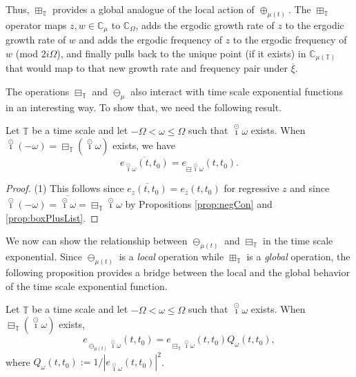 \documentclass[reqno]{amsart}
\begin{document}
Thus, $\boxplus_\mathbb{T}$ provides a global analogue of the local action of $\oplus_{\mu(t)}$.
The $\boxplus_{\mathbb{T}}$ operator maps $z,w\in\mathbb{C}_\mu$ to $\mathbb{C}_\Omega$, adds the ergodic
growth rate of $z$ to the ergodic growth rate of $w$ and adds the ergodic frequency
of $z$ to the ergodic frequency of $w$ (mod $2i \Omega$), and finally pulls back to
the unique point (if it exists) in $\mathbb{C}_{\mu(\mathbb{T})}$ that would map to that new growth
rate and frequency pair under $\overline{\xi}$.

The operations $\boxminus_\mathbb{T}$ and $\ominus_\mu$ also interact with time scale
exponential functions in an interesting way. To show that, we need the following
result.

\begin{proposition}
Let $\mathbb{T}$ be a time scale and let $-\Omega < \omega \leq \Omega$ such that
$\overset{\odot}{\imath} \omega$ exists. When $\overset{\odot}{\imath}(-\omega) = \boxminus_{\mathbb{T}} (\overset{\odot}{\imath} \omega)$
exists, we have
$$
\overline{e_{\overset{\odot}{\imath} \omega}(t,t_0)} = e_{\boxminus \overset{\odot}{\imath} \omega}(t,t_0).
$$
\end{proposition}

\begin{proof}
(1) This follows since $\overline{e_{z}(t,t_0)} = e_{\overline{z}}(t,t_0)$ for
regressive $z$ and since $\overset{\odot}{\imath} (-\omega) = \overline{\overset{\odot}{\imath} \omega} = \boxminus_{\mathbb{T}}
 \overset{\odot}{\imath} \omega$ by Propositions \ref{prop:negCon} and \ref{prop:boxPlusList}.
\end{proof}

We now can show the relationship between $\ominus_{\mu(t)}$ and $\boxminus_\mathbb{T}$ in the
time scale exponential. Since $\ominus_{\mu(t)}$ is a \emph{local} operation while
$\boxplus_{\mathbb{T}}$ is a \emph{global} operation, the following proposition provides a
bridge between the local and the global behavior of the time scale exponential
function.

\begin{proposition}
\label{prop:oplusBoxPlus}
Let $\mathbb{T}$ be a time scale and let $-\Omega < \omega \leq \Omega$ such that $\overset{\odot}{\imath} \omega$ exists. When $\boxminus_{\mathbb{T}} (\overset{\odot}{\imath} \omega)$ exists,
$$
e_{\ominus_{\mu(t)} \overset{\odot}{\imath} \omega}(t,t_0) = e_{\boxminus_{\mathbb{T}} \overset{\odot}{\imath} \omega}(t,t_0) Q_{\omega}(t,t_0),
$$
where $Q_\omega(t,t_0):=1/|e_{\overset{\odot}{\imath} \omega}(t,t_0)|^2$.
\end{proposition}
\end{document}
